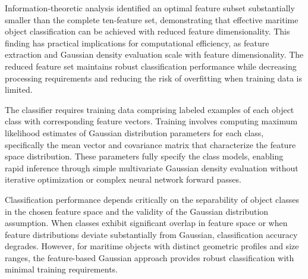 \documentclass{erauthesis}
\begin{document}
Information-theoretic analysis identified an optimal feature subset substantially smaller than the complete ten-feature set, demonstrating that effective maritime object classification can be achieved with reduced feature dimensionality.
This finding has practical implications for computational efficiency, as feature extraction and Gaussian density evaluation scale with feature dimensionality.
The reduced feature set maintains robust classification performance while decreasing processing requirements and reducing the risk of overfitting when training data is limited.

The classifier requires training data comprising labeled examples of each object class with corresponding feature vectors.
Training involves computing maximum likelihood estimates of Gaussian distribution parameters for each class, specifically the mean vector and covariance matrix that characterize the feature space distribution.
These parameters fully specify the class models, enabling rapid inference through simple multivariate Gaussian density evaluation without iterative optimization or complex neural network forward passes.

Classification performance depends critically on the separability of object classes in the chosen feature space and the validity of the Gaussian distribution assumption.
When classes exhibit significant overlap in feature space or when feature distributions deviate substantially from Gaussian, classification accuracy degrades.
However, for maritime objects with distinct geometric profiles and size ranges, the feature-based Gaussian approach provides robust classification with minimal training requirements.
\end{document}
